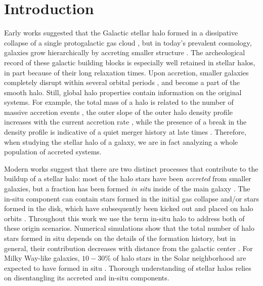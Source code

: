 \documentclass[apj, twocolappendix, numberedappendix, appendixfloats]{emulateapj}
\begin{document}
\section{Introduction}
Early works suggested that the Galactic stellar halo formed in a dissipative collapse of a single protogalactic gas cloud \citep{els}, but in today's prevalent cosmology, galaxies grow hierarchically by accreting smaller structure \citep{white1978, diemand2008, springel2008, klypin2011}.
The archeological record of these galactic building blocks is especially well retained in stellar halos, in part because of their long relaxation times.
Upon accretion, smaller galaxies completely disrupt within several orbital periods \citep{helmi1999b}, and become a part of the smooth halo.
Still, global halo properties contain information on the original systems.
For example, the total mass of a halo is related to the number of massive accretion events \citep{bj2005, cooper2010}, the outer slope of the outer halo density profile increases with the current accretion rate \citep{diemer2014}, while the presence of a break in the density profile is indicative of a quiet merger history at late times \citep{deason2013}.
Therefore, when studying the stellar halo of a galaxy, we are in fact analyzing a whole population of accreted systems.

Modern works suggest that there are two distinct processes that contribute to the buildup of a stellar halo: most of the halo stars have been \emph{accreted} from smaller galaxies, but a fraction has been formed \emph{in situ} inside of the main galaxy \citep{zolotov2009, font2011, cooper2015}.
The in-situ component can contain stars formed in the initial gas collapse \citep{samland2003} and/or stars formed in the disk, which have subsequently been kicked out and placed on halo orbits \citep{purcell2010}.
Throughout this work we use the term in-situ halo to address both of these origin scenarios.
Numerical simulations show that the total number of halo stars formed in situ depends on the details of the formation history, but in general, their contribution decreases with distance from the galactic center \citep[e.g.,][]{zolotov2009, cook2016}.
For Milky Way-like galaxies, $10-30$\% of halo stars in the Solar neighborhood are expected to have formed in situ \citep{zolotov2009}. 
Thorough understanding of stellar halos relies on disentangling its accreted and in-situ components.
\end{document}
